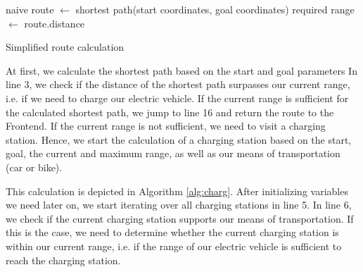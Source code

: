 \documentclass[a4paper]{article}
\begin{document}
\begin{algorithm}[H]
naive route $\leftarrow$  shortest path(start coordinates, goal coordinates)\;
required range $\leftarrow$ route.distance\;
 \caption{Simplified route calculation}
 \label{alg:route}
\end{algorithm}\par\bigskip
At first, we calculate the shortest path based on the start and goal parameters
In line 3, we check if the distance of the shortest path surpasses our current range, i.e. if we need to charge our electric vehicle.
If the current range is sufficient for the calculated shortest path, we jump to line 16 and return the route to the Frontend.
If the current range is not sufficient, we need to visit a charging station.
Hence, we start the calculation of a charging station based on the start, goal, the current and maximum range, as well as our means of transportation (car or bike).\par\medskip
This calculation is depicted in Algorithm \ref{alg:charg}. 
After initializing variables we need later on, we start iterating over all charging stations in line 5.
In line 6, we check if the current charging station supports our means of transportation.
If this is the case, we need to determine whether the current charging station is within our current range, i.e. if the range of our electric vehicle is sufficient to reach the charging station.
\par\bigskip
\end{document}

